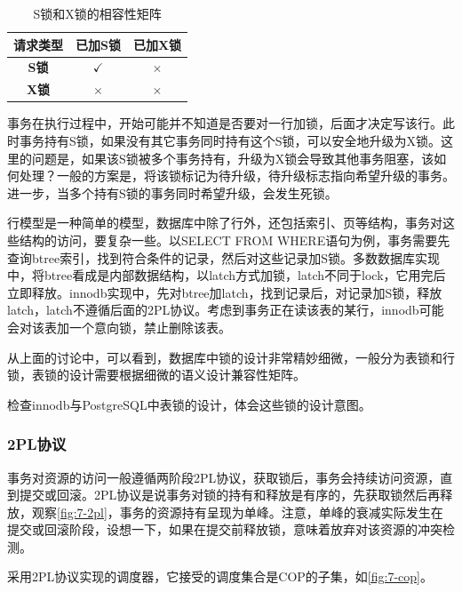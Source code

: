 \begin{table}[H]
    \centering
    \caption{S锁和X锁的相容性矩阵}\label{tab:lock}
    \begin{tabular}{ccc}
        \toprule
        \textbf{请求类型} & \textbf{已加S锁} & \textbf{已加X锁} \\
        \midrule
        \textbf{S锁} & $\checkmark$ & $\times$ \\
        \textbf{X锁} & $\times$ & $\times$ \\
        \bottomrule
    \end{tabular}
\end{table}

事务在执行过程中，开始可能并不知道是否要对一行加锁，后面才决定写该行。此时事务持有S锁，如果没有其它事务同时持有这个S锁，可以安全地升级为X锁。这里的问题是，如果该S锁被多个事务持有，升级为X锁会导致其他事务阻塞，该如何处理？一般的方案是，将该锁标记为待升级，待升级标志指向希望升级的事务。进一步，当多个持有S锁的事务同时希望升级，会发生死锁。

行模型是一种简单的模型，数据库中除了行外，还包括索引、页等结构，事务对这些结构的访问，要复杂一些。以SELECT FROM WHERE语句为例，事务需要先查询btree索引，找到符合条件的记录，然后对这些记录加S锁。多数数据库实现中，将btree看成是内部数据结构，以latch方式加锁，latch不同于lock，它用完后立即释放。innodb实现中，先对btree加latch，找到记录后，对记录加S锁，释放latch，latch不遵循后面的2PL协议。考虑到事务正在读该表的某行，innodb可能会对该表加一个意向锁，禁止删除该表。

从上面的讨论中，可以看到，数据库中锁的设计非常精妙细微，一般分为表锁和行锁，表锁的设计需要根据细微的语义设计兼容性矩阵。

\begin{exercise}
    检查innodb与PostgreSQL中表锁的设计，体会这些锁的设计意图。
\end{exercise}

\subsubsection*{2PL协议}

事务对资源的访问一般遵循两阶段2PL协议，获取锁后，事务会持续访问资源，直到提交或回滚。2PL协议是说事务对锁的持有和释放是有序的，先获取锁然后再释放，观察\figurename\ref{fig:7-2pl}，事务的资源持有呈现为单峰。注意，单峰的衰减实际发生在提交或回滚阶段，设想一下，如果在提交前释放锁，意味着放弃对该资源的冲突检测。

采用2PL协议实现的调度器，它接受的调度集合是COP的子集，如\figurename\ref{fig:7-cop}。

